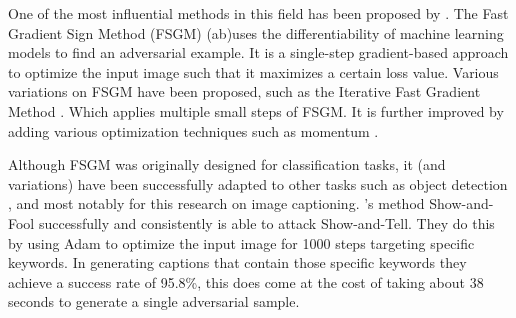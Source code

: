 One of the most influential methods in this field has been proposed by \citeauthor{goodfellow2015explaining}. The Fast Gradient Sign Method (FSGM) (ab)uses the differentiability of machine learning models to find an adversarial example. It is a single-step gradient-based approach to optimize the input image such that it maximizes a certain loss value. Various variations on FSGM have been proposed, such as the Iterative Fast Gradient Method \cite{Kurakin}. Which applies multiple small steps of FSGM. It is further improved by adding various optimization techniques such as momentum \cite{9237700}.

Although FSGM was originally designed for classification tasks, it (and variations) have been successfully adapted to other tasks such as object detection \cite{AdversarialAttacksOnFace,AdversarialFasterRCNN,DBLP:journals/corr/abs-1907-10310}, and most notably for this research on image captioning\cite{Hongge}. \citeauthor{Hongge}'s method Show-and-Fool successfully and consistently is able to attack Show-and-Tell\cite{showandtell}. They do this by using Adam\cite{kingma2017adam} to optimize the input image for 1000 steps targeting specific keywords. In generating captions that contain those specific keywords they achieve a success rate of 95.8\%, this does come at the cost of taking about 38 seconds to generate a single adversarial sample.

